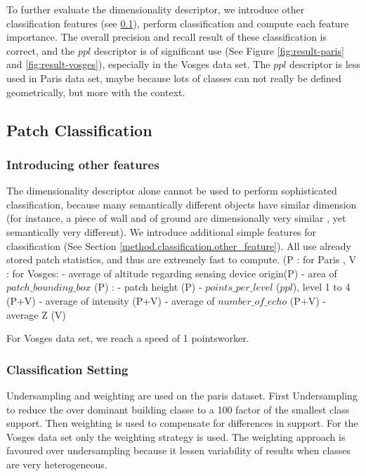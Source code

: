 		
		To further evaluate the dimensionality descriptor, we introduce other classification features (see \ref{result.classification}), perform classification and compute each feature importance.
		The overall precision and recall result of these classification is correct, and the $ppl$ descriptor is of significant use (See Figure \ref{fig:result-paris} and \ref{fig:result-vosges}), especially in the Vosges data set. The $ppl$ descriptor is less used in Paris data set, maybe because lots of classes can not really be defined geometrically, but more with the context.
		  
	\subsection{Patch Classification}
		\label{result.classification}
		 
		\subsubsection{Introducing other features}
		The dimensionality descriptor alone cannot be used to perform sophisticated classification,
		because many semantically different objects have similar dimension 
		(for instance, a piece of wall and of ground are dimensionally very similar
		, yet semantically very different).
		We introduce additional simple features for classification (See Section \ref{method.classification.other_feature}). All use already stored patch statistics, and thus are extremely fast to compute.
		(P : for Paris , V : for Vosges: 
		- average of altitude regarding sensing device origin(P)
		- area of $patch\_bounding\_box$ (P) : 
		- patch height (P)
		- $points\_per\_level$ ($ppl$), level 1 to 4 (P+V)
		- average of intensity (P+V)
		- average of $number\_of\_echo$ (P+V) 
		- average Z (V)
		
		For Vosges data set, we reach a speed of 1 \mega points\per \second \per worker.
		\subsubsection{Classification Setting} 
		Undersampling and weighting are used on the paris dataset. First Undersampling to reduce the over dominant building classe to a 100 factor of the smallest class support. Then weighting is used to compensate for differences in support. 
		For the Vosges data set only the weighting strategy is used. 
		The weighting approach is favoured over undersampling because it lessen variability of results when classes are very heterogeneous.
		
